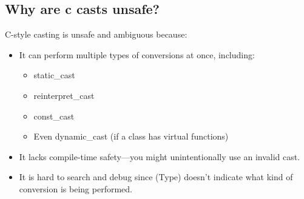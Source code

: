 \documentclass{report}
\begin{document}
    \subsection{Why are c casts unsafe?}
    \bigbreak \noindent 
    C-style casting is unsafe and ambiguous because:
    \begin{itemize}
        \item It can perform multiple types of conversions at once, including:
            \begin{itemize}
                \item static\_cast
                \item reinterpret\_cast
                \item const\_cast
                \item Even dynamic\_cast (if a class has virtual functions)
            \end{itemize}
        \item It lacks compile-time safety—you might unintentionally use an invalid cast.
        \item It is hard to search and debug since (Type) doesn’t indicate what kind of conversion is being performed.
    \end{itemize}














    

    
\end{document}
